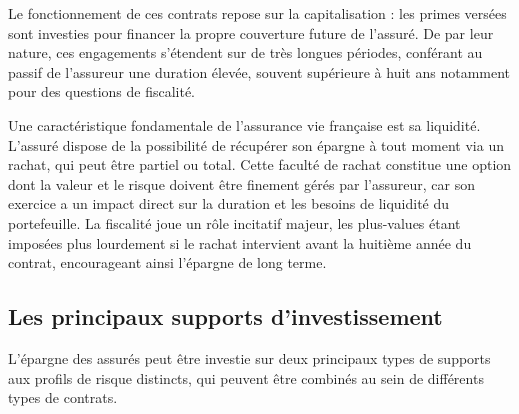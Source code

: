 Le fonctionnement de ces contrats repose sur la capitalisation : les primes versées sont investies pour financer la propre couverture future de l'assuré. De par leur nature, ces engagements s'étendent sur de très longues périodes, conférant au passif de l'assureur une duration élevée, souvent supérieure à huit ans notamment pour des questions de fiscalité.

Une caractéristique fondamentale de l'assurance vie française est sa liquidité. L'assuré dispose de la possibilité de récupérer son épargne à tout moment via un rachat, qui peut être partiel ou total. Cette faculté de rachat constitue une option dont la valeur et le risque doivent être finement gérés par l'assureur, car son exercice a un impact direct sur la duration et les besoins de liquidité du portefeuille. La fiscalité joue un rôle incitatif majeur, les plus-values étant imposées plus lourdement si le rachat intervient avant la huitième année du contrat, encourageant ainsi l'épargne de long terme.

\subsection{Les principaux supports d'investissement}

L'épargne des assurés peut être investie sur deux principaux types de supports aux profils de risque distincts, qui peuvent être combinés au sein de différents types de contrats.



